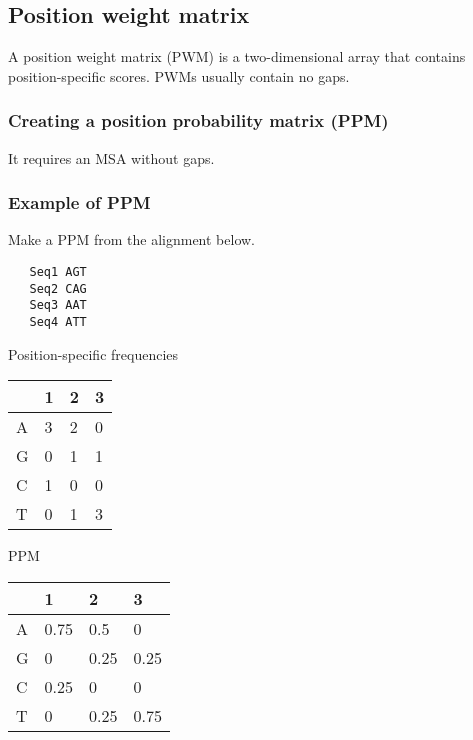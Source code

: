 %
%

%
%
\subsection{Position weight matrix }
A position weight matrix (PWM) is a two-dimensional array that contains position-specific scores. PWMs usually contain no gaps.

%
%
\subsubsection*{Creating a position probability matrix (PPM)}
It requires an MSA without gaps.

%
%
\subsubsection*{Example of PPM}
Make a PPM from the alignment below.

\begin{verbatim}
   Seq1 AGT
   Seq2 CAG
   Seq3 AAT
   Seq4 ATT
\end{verbatim}

\noindent
Position-specific frequencies
\begin{table}[H]
\centering
\begin{tabular}{|l|l|l|l|}
\hline
  & 1 & 2 & 3 \\ \hline
A & 3 & 2 & 0 \\ \hline
G & 0 & 1 & 1 \\ \hline
C & 1 & 0 & 0 \\ \hline
T & 0 & 1 & 3 \\ \hline
\end{tabular}
\end{table}

\noindent
PPM
\begin{table}[H]
\centering
\begin{tabular}{|l|l|l|l|}
\hline
  & 1    & 2    & 3    \\ \hline
A & 0.75 & 0.5  & 0    \\ \hline
G & 0    & 0.25 & 0.25 \\ \hline
C & 0.25 & 0    & 0    \\ \hline
T & 0    & 0.25 & 0.75 \\ \hline
\end{tabular}
\end{table}

